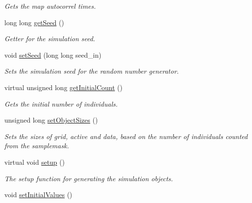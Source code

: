 \begin{DoxyCompactItemize}
\begin{DoxyCompactList}\small\item\em Gets the map autocorrel times. \end{DoxyCompactList}\item 
long long \hyperlink{class_tree_a857521315ca6bd9b3300d099488d74f1}{get\+Seed} ()
\begin{DoxyCompactList}\small\item\em Getter for the simulation seed. \end{DoxyCompactList}\item 
void \hyperlink{class_tree_ab240ab1988cbde281a6811b3fdc1dd5d}{set\+Seed} (long long seed\+\_\+in)
\begin{DoxyCompactList}\small\item\em Sets the simulation seed for the random number generator. \end{DoxyCompactList}\item 
virtual unsigned long \hyperlink{class_tree_a1e0685310a5a9bca4d6069e8d4ce1f1b}{get\+Initial\+Count} ()
\begin{DoxyCompactList}\small\item\em Gets the initial number of individuals. \end{DoxyCompactList}\item 
unsigned long \hyperlink{class_tree_a869ab0aba75336f737cbb137c74b8abc}{set\+Object\+Sizes} ()
\begin{DoxyCompactList}\small\item\em Sets the sizes of grid, active and data, based on the number of individuals counted from the samplemask. \end{DoxyCompactList}\item 
virtual void \hyperlink{class_tree_aec10ea2b720edc13a38310afdfe2b6e4}{setup} ()
\begin{DoxyCompactList}\small\item\em The setup function for generating the simulation objects. \end{DoxyCompactList}\item 
void \hyperlink{class_tree_aec2640897132a1b667e852bbafc14c78}{set\+Initial\+Values} ()\hypertarget{class_tree_aec2640897132a1b667e852bbafc14c78}{}\label{class_tree_aec2640897132a1b667e852bbafc14c78}


\end{DoxyCompactItemize}
